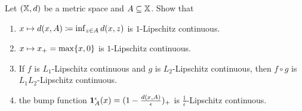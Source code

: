 
\begin{exercise}[subtitle={Lipschitz continuous bump functions \Coffeecup\Coffeecup}]
    \label{ex: lipschitz bump functions}
    Let \((\mathbb{X}, d)\) be a metric space and \(A \subseteq \mathbb{X}\). 
    Show that
    \begin{enumerate}[label=(\alph*)]
        \item\label{it: (lip cont bump) set distance}
        \(x\mapsto d(x,A)\coloneq \inf_{z \in A} d(x,z)\) is \(1\)-Lipschitz continuous.

        \item\label{it: (lip cont bump) hinge is lip}
        \(x\mapsto x_+ = \max\{x,0\}\) is \(1\)-Lipschitz continuous.

        \item\label{it: (lip cont bump) composition}
        If \(f\) is \(L_1\)-Lipschitz continuous and \(g\) is \(L_2\)-Lipschitz continuous, then
        \(f\circ g\) is \(L_1L_2\)-Lipschitz continuous.

        \item\label{it: (lip cont bump) bump is lip}
        the bump function \(\ind{A}^\epsilon(x) = (1 - \frac{\metric(x,A)}\epsilon)_+\)
        is \(\frac1\epsilon\)-Lipschitz continuous.
    \end{enumerate}
\end{exercise}
